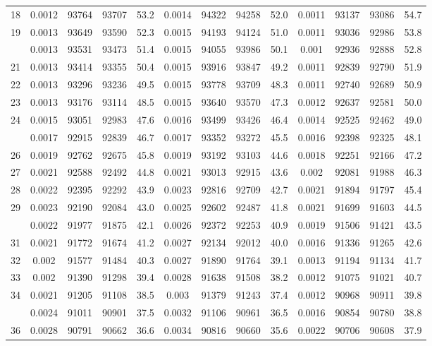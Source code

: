 \documentclass[
  14pt,
]{article}
\begin{document}
\begin{longtable}[t]{lcccccccccccc}
18 & 0.0012 & 93764 & 93707 & 53.2 & 0.0014 & 94322 & 94258 & 52.0 & 0.0011 & 93137 & 93086 & 54.7\\
19 & 0.0013 & 93649 & 93590 & 52.3 & 0.0015 & 94193 & 94124 & 51.0 & 0.0011 & 93036 & 92986 & 53.8\\
\addlinespace
20 & 0.0013 & 93531 & 93473 & 51.4 & 0.0015 & 94055 & 93986 & 50.1 & 0.001 & 92936 & 92888 & 52.8\\
21 & 0.0013 & 93414 & 93355 & 50.4 & 0.0015 & 93916 & 93847 & 49.2 & 0.0011 & 92839 & 92790 & 51.9\\
22 & 0.0013 & 93296 & 93236 & 49.5 & 0.0015 & 93778 & 93709 & 48.3 & 0.0011 & 92740 & 92689 & 50.9\\
23 & 0.0013 & 93176 & 93114 & 48.5 & 0.0015 & 93640 & 93570 & 47.3 & 0.0012 & 92637 & 92581 & 50.0\\
24 & 0.0015 & 93051 & 92983 & 47.6 & 0.0016 & 93499 & 93426 & 46.4 & 0.0014 & 92525 & 92462 & 49.0\\
\addlinespace
25 & 0.0017 & 92915 & 92839 & 46.7 & 0.0017 & 93352 & 93272 & 45.5 & 0.0016 & 92398 & 92325 & 48.1\\
26 & 0.0019 & 92762 & 92675 & 45.8 & 0.0019 & 93192 & 93103 & 44.6 & 0.0018 & 92251 & 92166 & 47.2\\
27 & 0.0021 & 92588 & 92492 & 44.8 & 0.0021 & 93013 & 92915 & 43.6 & 0.002 & 92081 & 91988 & 46.3\\
28 & 0.0022 & 92395 & 92292 & 43.9 & 0.0023 & 92816 & 92709 & 42.7 & 0.0021 & 91894 & 91797 & 45.4\\
29 & 0.0023 & 92190 & 92084 & 43.0 & 0.0025 & 92602 & 92487 & 41.8 & 0.0021 & 91699 & 91603 & 44.5\\
\addlinespace
30 & 0.0022 & 91977 & 91875 & 42.1 & 0.0026 & 92372 & 92253 & 40.9 & 0.0019 & 91506 & 91421 & 43.5\\
31 & 0.0021 & 91772 & 91674 & 41.2 & 0.0027 & 92134 & 92012 & 40.0 & 0.0016 & 91336 & 91265 & 42.6\\
32 & 0.002 & 91577 & 91484 & 40.3 & 0.0027 & 91890 & 91764 & 39.1 & 0.0013 & 91194 & 91134 & 41.7\\
33 & 0.002 & 91390 & 91298 & 39.4 & 0.0028 & 91638 & 91508 & 38.2 & 0.0012 & 91075 & 91021 & 40.7\\
34 & 0.0021 & 91205 & 91108 & 38.5 & 0.003 & 91379 & 91243 & 37.4 & 0.0012 & 90968 & 90911 & 39.8\\
\addlinespace
35 & 0.0024 & 91011 & 90901 & 37.5 & 0.0032 & 91106 & 90961 & 36.5 & 0.0016 & 90854 & 90780 & 38.8\\
36 & 0.0028 & 90791 & 90662 & 36.6 & 0.0034 & 90816 & 90660 & 35.6 & 0.0022 & 90706 & 90608 & 37.9\\

\end{longtable}
\end{document}

